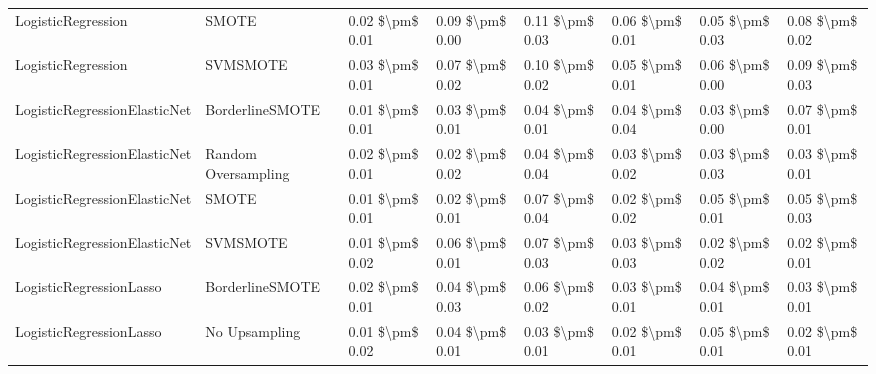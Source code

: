 \begin{tabular}{llllllll}
             LogisticRegression &                         SMOTE & 0.02 \$\textbackslash pm\$ 0.01 &           0.09 \$\textbackslash pm\$ 0.00 &       0.11 \$\textbackslash pm\$ 0.03 &        0.06 \$\textbackslash pm\$ 0.01 &                         0.05 \$\textbackslash pm\$ 0.03 &     0.08 \$\textbackslash pm\$ 0.02 \\
             LogisticRegression &                      SVMSMOTE & 0.03 \$\textbackslash pm\$ 0.01 &           0.07 \$\textbackslash pm\$ 0.02 &       0.10 \$\textbackslash pm\$ 0.02 &        0.05 \$\textbackslash pm\$ 0.01 &                         0.06 \$\textbackslash pm\$ 0.00 &     0.09 \$\textbackslash pm\$ 0.03 \\
   LogisticRegressionElasticNet &               BorderlineSMOTE & 0.01 \$\textbackslash pm\$ 0.01 &           0.03 \$\textbackslash pm\$ 0.01 &       0.04 \$\textbackslash pm\$ 0.01 &        0.04 \$\textbackslash pm\$ 0.04 &                         0.03 \$\textbackslash pm\$ 0.00 &     0.07 \$\textbackslash pm\$ 0.01 \\
   LogisticRegressionElasticNet &           Random Oversampling & 0.02 \$\textbackslash pm\$ 0.01 &           0.02 \$\textbackslash pm\$ 0.02 &       0.04 \$\textbackslash pm\$ 0.04 &        0.03 \$\textbackslash pm\$ 0.02 &                         0.03 \$\textbackslash pm\$ 0.03 &     0.03 \$\textbackslash pm\$ 0.01 \\
   LogisticRegressionElasticNet &                         SMOTE & 0.01 \$\textbackslash pm\$ 0.01 &           0.02 \$\textbackslash pm\$ 0.01 &       0.07 \$\textbackslash pm\$ 0.04 &        0.02 \$\textbackslash pm\$ 0.02 &                         0.05 \$\textbackslash pm\$ 0.01 &     0.05 \$\textbackslash pm\$ 0.03 \\
   LogisticRegressionElasticNet &                      SVMSMOTE & 0.01 \$\textbackslash pm\$ 0.02 &           0.06 \$\textbackslash pm\$ 0.01 &       0.07 \$\textbackslash pm\$ 0.03 &        0.03 \$\textbackslash pm\$ 0.03 &                         0.02 \$\textbackslash pm\$ 0.02 &     0.02 \$\textbackslash pm\$ 0.01 \\
        LogisticRegressionLasso &               BorderlineSMOTE & 0.02 \$\textbackslash pm\$ 0.01 &           0.04 \$\textbackslash pm\$ 0.03 &       0.06 \$\textbackslash pm\$ 0.02 &        0.03 \$\textbackslash pm\$ 0.01 &                         0.04 \$\textbackslash pm\$ 0.01 &     0.03 \$\textbackslash pm\$ 0.01 \\
        LogisticRegressionLasso &                 No Upsampling & 0.01 \$\textbackslash pm\$ 0.02 &           0.04 \$\textbackslash pm\$ 0.01 &       0.03 \$\textbackslash pm\$ 0.01 &        0.02 \$\textbackslash pm\$ 0.01 &                         0.05 \$\textbackslash pm\$ 0.01 &     0.02 \$\textbackslash pm\$ 0.01 \\

\end{tabular}
